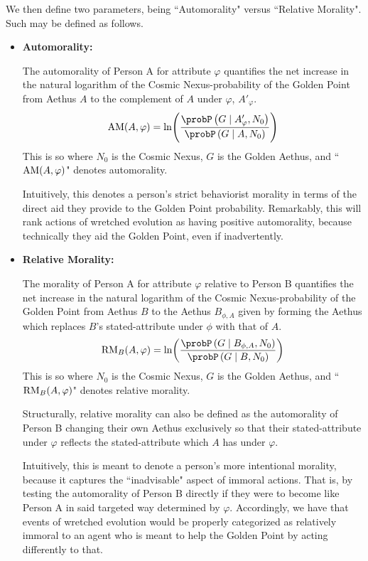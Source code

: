 We then define two parameters, being ``Automorality" versus ``Relative Morality". Such may be defined as follows.
\begin{itemize}
    \item \textbf{Automorality:}

    The automorality of Person A for attribute $\varphi$ quantifies the net increase in the natural logarithm of the Cosmic Nexus-probability of the Golden Point from Aethus $A$ to the complement of $A$ under $\varphi$, $A'_{\varphi}$.
    \begin{equation}
        \textnormal{AM} \! \left( A, \varphi \right) = \ln \! \left( \dfrac{\probP \left( G \mid A'_{\varphi}, N_0 \right)}{\probP \left( G \mid A, N_0 \right)} \right)
    \end{equation}
    This is so where $N_0$ is the Cosmic Nexus, $G$ is the Golden Aethus, and ``$\textnormal{AM} \! \left( A, \varphi \right)$" denotes automorality. 

    Intuitively, this denotes a person's strict behaviorist morality in terms of the direct aid they provide to the Golden Point probability. Remarkably, this will rank actions of wretched evolution as having positive automorality, because technically they aid the Golden Point, even if inadvertently. 
    
    \item \textbf{Relative Morality:}

    The morality of Person A for attribute $\varphi$ relative to Person B quantifies the net increase in the natural logarithm of the Cosmic Nexus-probability of the Golden Point from Aethus $B$ to the Aethus $B_{\phi, A}$ given by forming the Aethus which replaces $B$'s stated-attribute under $\phi$ with that of $A$.
    \begin{equation}
        \textnormal{RM}_{B} \! \left( A, \varphi \right) = \ln \! \left( \dfrac{\probP \left( G \mid B_{\phi, A}, N_0 \right)}{\probP \left( G \mid B, N_0 \right)} \right)
    \end{equation}
    This is so where $N_0$ is the Cosmic Nexus, $G$ is the Golden Aethus, and ``$\textnormal{RM}_{B} \! \left( A, \varphi \right)$" denotes relative morality. 

    Structurally, relative morality can also be defined as the automorality of Person B changing their own Aethus exclusively so that their stated-attribute under $\varphi$ reflects the stated-attribute which $A$ has under $\varphi$.

    Intuitively, this is meant to denote a person's more intentional morality, because it captures the ``inadvisable" aspect of immoral actions. That is, by testing the automorality of Person B directly if they were to become like Person A in said targeted way determined by $\varphi$. Accordingly, we have that events of wretched evolution would be properly categorized as relatively immoral to an agent who is meant to help the Golden Point by acting differently to that. 
\end{itemize}

